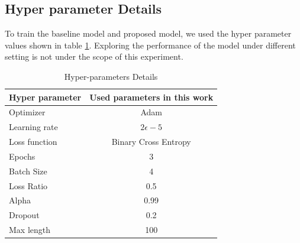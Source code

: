 \documentclass[%
	BCOR=8mm, %
	DIV=12,
	toc=bibliography, %
	toc=listof, %
	oneside, %
	egregdoesnotlikesansseriftitles, %
	]{scrbook}
\begin{document}
\subsection{Hyper parameter Details}
\label{subsection:hyperparameter}
To train the baseline model and proposed model, we used the hyper parameter values shown in table \ref{table:HyperparameterTable}. Exploring the performance of the model under different setting is not under the scope of this experiment. 
\begin{table}[H]
\centering
\begin{tabular}{ l c c }
\hline
Hyper parameter 		& \multicolumn{2}{c}{Used parameters in this work}\\
\hline
Optimizer 				& \multicolumn{2}{c}{Adam} \\
Learning rate 			& \multicolumn{2}{c}{ $2\epsilon -5$ } \\
Loss function 			& \multicolumn{2}{c}{Binary Cross Entropy}  \\
Epochs 				& \multicolumn{2}{c}{$3$} \\
Batch Size 			& \multicolumn{2}{c}{4 } \\
Loss Ratio 			&\multicolumn{2}{c}{0.5}\\
Alpha 			&\multicolumn{2}{c}{0.99}\\
Dropout  			& \multicolumn{2}{c}{0.2}  \\
Max length 			 & \multicolumn{2}{c}{100}  \\
\hline
\end{tabular}
\caption[Hyper-parameters Details]{Hyper-parameters Details}
\label{table:HyperparameterTable}
\end{table}
\end{document}
